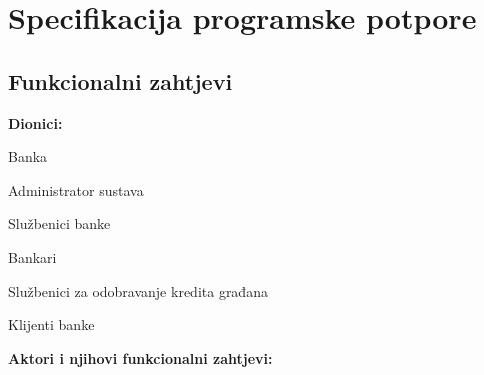 \chapter{Specifikacija programske potpore}
		
	\section{Funkcionalni zahtjevi}
			
			
			\noindent \textbf{Dionici:}
			
			\begin{packed_enum}
				
				\item Banka
				\item Administrator sustava
				\item Službenici banke
				\begin{packed_enum}
					\item Bankari
					\item Službenici za odobravanje kredita građana
				\end{packed_enum}
				\item Klijenti banke
				
			\end{packed_enum}
			
			\noindent \textbf{Aktori i njihovi funkcionalni zahtjevi:}
			
